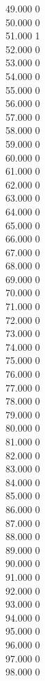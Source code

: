 { 49.000	0 \\
 50.000	0 \\
 51.000	1 \\
 52.000	0 \\
 53.000	0 \\
 54.000	0 \\
 55.000	0 \\
 56.000	0 \\
 57.000	0 \\
 58.000	0 \\
 59.000	0 \\
 60.000	0 \\
 61.000	0 \\
 62.000	0 \\
 63.000	0 \\
 64.000	0 \\
 65.000	0 \\
 66.000	0 \\
 67.000	0 \\
 68.000	0 \\
 69.000	0 \\
 70.000	0 \\
 71.000	0 \\
 72.000	0 \\
 73.000	0 \\
 74.000	0 \\
 75.000	0 \\
 76.000	0 \\
 77.000	0 \\
 78.000	0 \\
 79.000	0 \\
 80.000	0 \\
 81.000	0 \\
 82.000	0 \\
 83.000	0 \\
 84.000	0 \\
 85.000	0 \\
 86.000	0 \\
 87.000	0 \\
 88.000	0 \\
 89.000	0 \\
 90.000	0 \\
 91.000	0 \\
 92.000	0 \\
 93.000	0 \\
 94.000	0 \\
 95.000	0 \\
 96.000	0 \\
 97.000	0 \\
 98.000	0 \\
}
